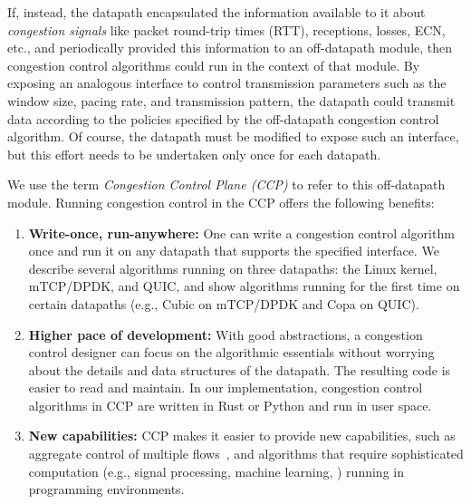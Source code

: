 
\smallskip
If, instead, the datapath encapsulated the information available to it about {\em congestion signals} like packet round-trip times (RTT), receptions, losses, ECN, etc., and periodically provided this information to an off-datapath module, then congestion control algorithms could run in the context of that module. 
By exposing an analogous interface to control transmission parameters such as the window size, pacing rate, and transmission pattern, the datapath could transmit data according to the policies specified by the off-datapath congestion control algorithm. Of course, the datapath must be modified to expose
such an interface, but this effort needs to be undertaken only once for each datapath.

We use the term {\em Congestion Control Plane (CCP)} to refer to this off-datapath module. Running congestion control in the CCP offers the following benefits:
\begin{enumerate}
    \item \textbf{Write-once, run-anywhere:} One can write a congestion control algorithm once and run it on any datapath that supports the specified interface. 
    We describe several algorithms running on three datapaths: the Linux kernel, mTCP/DPDK, and QUIC, and show algorithms running for the first time on certain datapaths (e.g., Cubic on mTCP/DPDK and Copa on QUIC).
    \item \textbf{Higher pace of development:} With good abstractions,
      a congestion control designer can focus on the algorithmic essentials
      without worrying about the details and data structures of the
      datapath. The resulting code is easier to read and maintain. In our implementation, congestion control algorithms in CCP are written in Rust or Python and run in user space. 
    \item \textbf{New capabilities:} CCP makes it easier to provide new
      capabilities, such as aggregate control of multiple flows~\cite{cm}, and algorithms that require sophisticated computation (e.g., signal processing, machine learning, \etc) running in \userspace programming environments. 
\end{enumerate}

